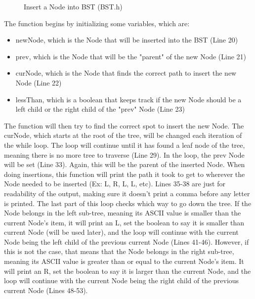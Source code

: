 \documentclass[letterpaper, 10pt]{article}
\begin{document}
\vspace{-1em}
\begin{figure}[H]
  \centering
   
  \label{fig:figure3.6-part1}
\end{figure}

\begin{figure}[H]
  \centering
   
  \caption{Insert a Node into BST (BST.h)}
  \label{fig:figure3.6-part2}
\end{figure}

\noindent
The function begins by initializing some variables, which are:
\begin{itemize}
    \item newNode, which is the Node that will be inserted into the BST (Line 20)
    \item prev, which is the Node that will be the "parent" of the new Node (Line 21)
    \item curNode, which is the Node that finds the correct path to insert the new Node (Line 22)
    \item lessThan, which is a boolean that keeps track if the new Node should be a left child or the right child of the "prev" Node (Line 23)
\end{itemize}

\noindent
The function will then try to find the correct spot to insert the new Node. The curNode, which starts at the root of the tree, will be changed each iteration of the while loop. The loop will continue until it has found a leaf node of the tree, meaning there is no more tree to traverse (Line 29). In the loop, the prev Node will be set (Line 33). Again, this will be the parent of the inserted Node. When doing insertions, this function will print the path it took to get to wherever the Node needed to be inserted (Ex: L, R, L, L, etc). Lines 35-38 are just for readability of the output, making sure it doesn't print a comma before any letter is printed. The last part of this loop checks which way to go down the tree. If the Node belongs in the left sub-tree, meaning its ASCII value is smaller than the current Node's item, it will print an L, set the boolean to say it is smaller than current Node (will be used later), and the loop will continue with the current Node being the left child of the previous current Node (Lines 41-46). However, if this is not the case, that means that the Node belongs in the right sub-tree, meaning its ASCII value is greater than or equal to the current Node's item. It will print an R, set the boolean to say it is larger than the current Node, and the loop will continue with the current Node being the right child of the previous current Node (Lines 48-53). 
\end{document}
